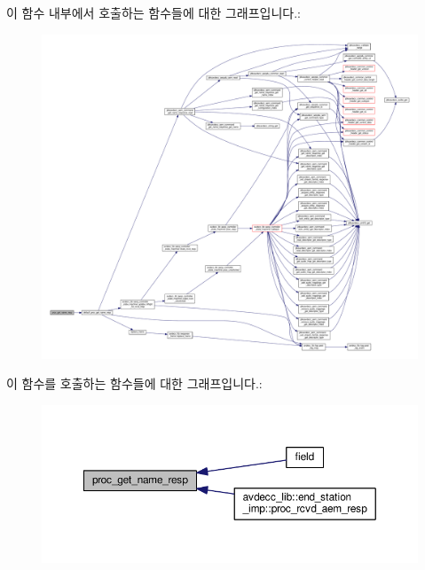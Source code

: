 이 함수 내부에서 호출하는 함수들에 대한 그래프입니다.\+:
\nopagebreak
\begin{figure}[H]
\begin{center}
\leavevmode
\includegraphics[width=350pt]{classavdecc__lib_1_1descriptor__base__imp_ac4e290a88039a8e4915f7b9f8738881f_cgraph}
\end{center}
\end{figure}




이 함수를 호출하는 함수들에 대한 그래프입니다.\+:
\nopagebreak
\begin{figure}[H]
\begin{center}
\leavevmode
\includegraphics[width=350pt]{classavdecc__lib_1_1descriptor__base__imp_ac4e290a88039a8e4915f7b9f8738881f_icgraph}
\end{center}
\end{figure}



